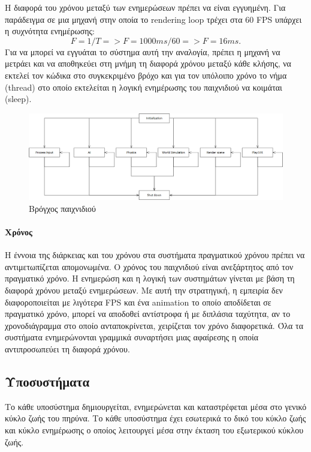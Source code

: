 	Η διαφορά του χρόνου μεταξύ των ενημερώσεων πρέπει να είναι εγγυημένη. Για παράδειγμα σε μια μηχανή στην οποία το rendering loop τρέχει στα 60 \gls{FPS} υπάρχει η συχνότητα ενημέρωσης:
	\begin{equation}
	 F = 1/T =>  F = 1000ms/60 => F = 16ms. 
	\end{equation}
	Για να μπορεί να εγγυάται το σύστημα αυτή την αναλογία, πρέπει η μηχανή να μετράει και να αποθηκεύει στη μνήμη τη διαφορά χρόνου μεταξύ κάθε κλήσης, να εκτελεί τον κώδικα στο συγκεκριμένο βρόχο και για τον υπόλοιπο χρόνο το νήμα (thread) στο οποίο εκτελείται η λογική ενημέρωσης του παιχνιδιού να κοιμάται (sleep).
	
	\begin{figure}[h!]
		\centering
		\includegraphics[width=160mm]{Images/gameloops_update}
		\caption{Βρόγχος παιχνιδιού}
		\label{fig:gameloops}
	\end{figure}
		
	\paragraph{Χρόνος}
	Η έννοια της διάρκειας και του χρόνου στα συστήματα πραγματικού χρόνου πρέπει να αντιμετωπίζεται απομονωμένα. Ο χρόνος του παιχνιδιού  είναι ανεξάρτητος από τον πραγματικό χρόνο. Η ενημερώση και η λογική των συστημάτων γίνεται με βάση τη διαφορά χρόνου μεταξύ ενημερώσεων. Με αυτή την στρατηγική, η εμπειρία δεν διαφοροποιείται με λιγότερα \gls{FPS} και ένα animation το οποίο αποδίδεται σε πραγματικό χρόνο, μπορεί να αποδοθεί αντίστροφα ή με διπλάσια ταχύτητα, αν το χρονοδιάγραμμα στο οποίο ανταποκρίνεται, χειρίζεται τον χρόνο διαφορετικά.
	Όλα τα συστήματα ενημερώνονται γραμμικά συναρτήσει μιας αφαίρεσης η οποία αντιπροσωπεύει τη διαφορά χρόνου.
	\subsection{Υποσυστήματα}
	Το κάθε υποσύστημα δημιουργείται, ενημερώνεται και καταστρέφεται μέσα στο γενικό κύκλο ζωής του πηρύνα. Το κάθε υποσύστημα έχει εσωτερικά το δικό του κύκλο ζωής και κύκλο ενημέρωσης ο οποίος λειτουργεί μέσα στην έκταση του εξωτερικού κύκλου ζωής.
	
